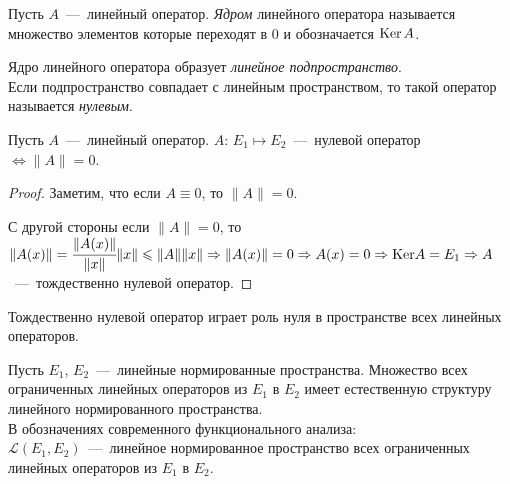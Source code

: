 \begin{definition}
    Пусть $A$~---~линейный оператор. \textit{Ядром} линейного оператора называется множество элементов которые переходят в $0$ и обозначается $\Ker A$.
\end{definition}

\begin{note}
    Ядро линейного оператора образует \textit{линейное подпространство}. \\ 
    Если подпространство совпадает с линейным пространством, то такой оператор называется \textit{нулевым}.
\end{note}

\begin{proposition}
    Пусть $A$~---~линейный оператор. $A$: $E_1 \mapsto E_2$~---~нулевой оператор $\Leftrightarrow \| A\| = 0$.
\end{proposition}

\begin{proof}
    Заметим, что если $A \equiv 0$, то $\| A \| = 0$.

    С другой стороны если $\| A \| = 0$, то $\| A(x) \| = \cfrac{\| A(x) \|}{\| x \|} \| x \| \leq \| A \| \| x \| \Rightarrow \| A (x) \| = 0 \Rightarrow A (x) = 0 \Rightarrow \text{Ker}A = E_1 \Rightarrow A$~---~тождественно нулевой оператор.
\end{proof}

\begin{note}
    Тождественно нулевой оператор играет роль нуля в пространстве всех линейных операторов.
\end{note}

\begin{theorem}
    Пусть $E_1$, $E_2$~---~линейные нормированные пространства. Множество всех ограниченных линейных операторов из $E_1$ в $E_2$ имеет естественную структуру линейного нормированного пространства. \\
    В обозначениях современного функционального анализа: \\
    $\mathcal{L}(E_1, E_2)$~---~линейное нормированное пространство всех ограниченных линейных операторов из $E_1$ в $E_2$.
\end{theorem}

